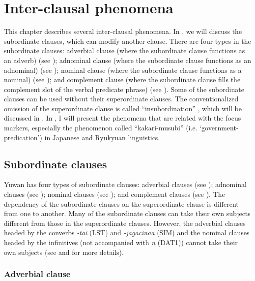 \chapter{Inter-clausal phenomena}

This chapter describes several inter-clausal phenomena. In , we will discuss the subordinate clauses, which can modify another clause. There are four types in the subordinate clauses: adverbial clause (where the subordinate clause functions as an adverb) (see ); adnominal clause (where the subordinate clause functions as an adnominal) (see ); nominal clause (where the subordinate clause functions as a nominal) (see ); and complement clause (where the subordinate clause fills the complement slot of the verbal predicate phrase) (see ). Some of the subordinate clauses can be used without their superordinate clauses. The conventionalized omission of the superordinate clause is called “insubordination” \citep{Evans2007}, which will be discussed in . In , I will present the phenomena that are related with the focus markers, especially the phenomenon called “kakari-musubi” (i.e. ‘government-predication’) in Japanese and Ryukyuan linguistics.

\section{Subordinate clauses}\label{sec:11.1}

Yuwan has four types of subordinate clauses: adverbial clauses (see ); adnominal clauses (see ); nominal clauses (see ); and complement clauses (see ). The dependency of the subordinate clauses on the superordinate clause is different from one to another. Many of the subordinate clauses can take their own subjects different from those in the superordinate clauses. However, the adverbial clauses headed by the converbs \textit{{}-tai} (LST) and \textit{{}-jagacinaa} (SIM) and the nominal clauses headed by the infinitives (not accompanied with \textit{n} (DAT1)) cannot take their own subjects (see  and  for more details).

\subsection{Adverbial clause}\label{sec:11.1.1}

